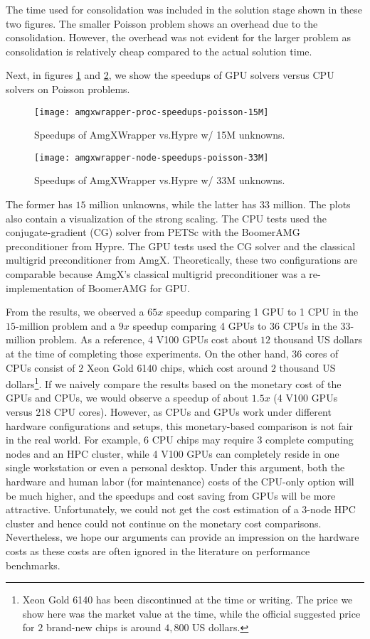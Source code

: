 The time used for consolidation was included in the solution stage shown in these two figures.
The smaller Poisson problem shows an overhead due to the consolidation.
However, the overhead was not evident for the larger problem as consolidation is relatively cheap compared to the actual solution time. 

Next, in figures \ref{fig:amgxwrapper-speedups-15M} and \ref{fig:amgxwrapper-speedups-33M}, we show the speedups of GPU solvers versus CPU solvers on Poisson problems.
\begin{figure}[hbt!]
    \texttt{[image: amgxwrapper-proc-speedups-poisson-15M]}
    \caption{Speedups of AmgXWrapper vs.\@ Hypre w/ 15M unknowns.}
    \label{fig:amgxwrapper-speedups-15M}
\end{figure}
\begin{figure}[hbt!]
    \texttt{[image: amgxwrapper-node-speedups-poisson-33M]}
    \caption{Speedups of AmgXWrapper vs.\@ Hypre w/ 33M unknowns.}
    \label{fig:amgxwrapper-speedups-33M}
\end{figure}
The former has $15$ million unknowns, while the latter has $33$ million.
The plots also contain a visualization of the strong scaling.
The CPU tests used the conjugate-gradient (CG) solver from PETSc with the BoomerAMG preconditioner from Hypre.
The GPU tests used the CG solver and the classical multigrid preconditioner from AmgX.
Theoretically, these two configurations are comparable because AmgX's classical multigrid preconditioner was a re-implementation of BoomerAMG for GPU.

From the results, we observed a $65x$ speedup comparing 1 GPU to 1 CPU in the $15$-million problem and a $9x$ speedup comparing 4 GPUs to 36 CPUs in the $33$-million problem.
As a reference, 4 V100 GPUs cost about $12$ thousand US dollars at the time of completing those experiments.
On the other hand, $36$ cores of CPUs consist of $2$ Xeon Gold 6140 chips, which cost around $2$ thousand US dollars\footnote{Xeon Gold 6140 has been discontinued at the time or writing. The price we show here was the market value at the time, while the official suggested price for $2$ brand-new chips is around $4,800$ US dollars.}.
If we naively compare the results based on the monetary cost of the GPUs and CPUs, we would observe a speedup of about $1.5x$ (4 V100 GPUs versus 218 CPU cores).
However, as CPUs and GPUs work under different hardware configurations and setups, this monetary-based comparison is not fair in the real world.
For example, $6$ CPU chips may require $3$ complete computing nodes and an HPC cluster, while 4 V100 GPUs can completely reside in one single workstation or even a personal desktop.
Under this argument, both the hardware and human labor (for maintenance) costs of the CPU-only option will be much higher, and the speedups and cost saving from GPUs will be more attractive.
Unfortunately, we could not get the cost estimation of a 3-node HPC cluster and hence could not continue on the monetary cost comparisons.
Nevertheless, we hope our arguments can provide an impression on the hardware costs as these costs are often ignored in the literature on performance benchmarks.


